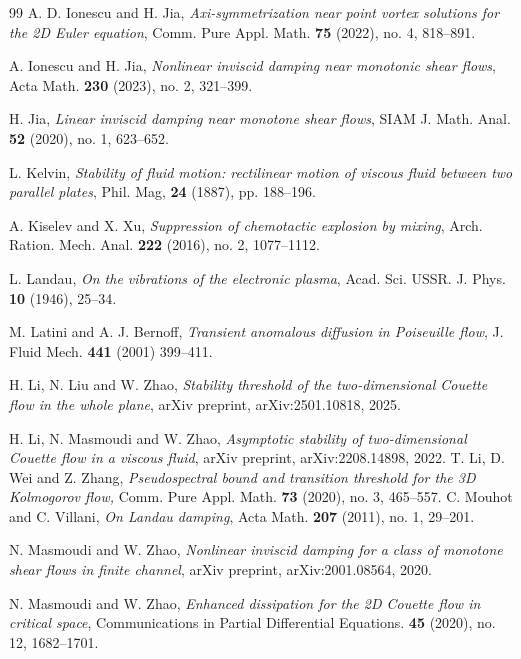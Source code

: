 \documentclass[reqno, 12pt]{amsart} %
\theoremstyle{plain} %
\theoremstyle{definition}
\theoremstyle{remark}
\numberwithin{equation}{section} %
\begin{document}
\begin{thebibliography}{99}
		A. D. Ionescu and H. Jia, 
		\textit{Axi-symmetrization near point vortex solutions for the 2D Euler equation}, 
		Comm. Pure Appl. Math. \textbf{75} (2022), no. 4, 818–891.
		
		A. Ionescu and H. Jia, 
		\textit{Nonlinear inviscid damping near monotonic shear flows}, 
		Acta Math. \textbf{230} (2023), no. 2, 321–399.
		
		H. Jia, 
		\textit{Linear inviscid damping near monotone shear flows}, 
		SIAM J. Math. Anal. \textbf{52} (2020), no. 1, 623–652.
		
		L. Kelvin, 
		\textit{Stability of fluid motion: rectilinear motion of viscous fluid between two parallel plates}, 
		Phil. Mag, \textbf{24} (1887), pp. 188–196.
		
		A. Kiselev and X. Xu, 
		\textit{Suppression of chemotactic explosion by mixing}, 
		Arch. Ration. Mech. Anal. \textbf{222} (2016), no. 2, 1077–1112.
		
		L. Landau, 
		\textit{On the vibrations of the electronic plasma}, 
		Acad. Sci. USSR. J. Phys. \textbf{10} (1946), 25–34.
		
		M. Latini and A. J. Bernoff, 
		\textit{Transient anomalous diffusion in Poiseuille flow}, 
		J. Fluid Mech. \textbf{441} (2001) 399–411.
		
		H. Li, N. Liu and W. Zhao, 
		\textit{Stability threshold of the two-dimensional Couette flow in the whole plane}, arXiv preprint,
		arXiv:2501.10818, 2025.
		
		H. Li, N. Masmoudi and W. Zhao, 
		\textit{Asymptotic stability of two-dimensional Couette flow in a viscous fluid}, arXiv preprint,
		arXiv:2208.14898, 2022.
		T. Li, D. Wei and  Z. Zhang,  \textit{Pseudospectral bound and transition threshold for the 3D Kolmogorov flow,} Comm. Pure Appl. Math. \textbf{73} (2020), no. 3, 465–557.
		C. Mouhot and C. Villani, 
		\textit{On Landau damping}, 
		Acta Math. \textbf{207} (2011), no. 1, 29–201.
		
		N. Masmoudi and W. Zhao, 
		\textit{Nonlinear inviscid damping for a class of monotone shear flows in finite channel}, arXiv preprint,
		arXiv:2001.08564, 2020.
		
		N. Masmoudi and W. Zhao, 
		\textit{Enhanced dissipation for the 2D Couette flow in critical space}, 
		Communications in Partial Differential Equations.  \textbf{45} (2020), no. 12, 1682–1701.
		

\end{thebibliography}
\end{document}
